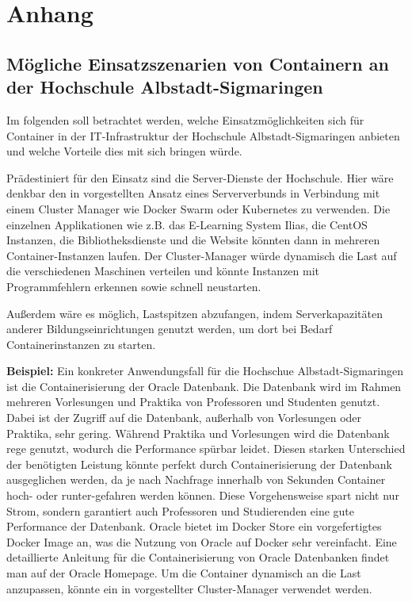 \section{Anhang}
\label{sec:anhang}

\subsection{Mögliche Einsatzszenarien von Containern an der Hochschule Albstadt-Sigmaringen}
\label{app:EinsatzHSAlbSig}

Im folgenden soll betrachtet werden, welche Einsatzmöglichkeiten sich für Container in der IT-Infrastruktur der Hochschule Albstadt-Sigmaringen anbieten und welche Vorteile dies mit sich bringen würde. 

Prädestiniert für den Einsatz sind die Server-Dienste der Hochschule.
Hier wäre denkbar den in  vorgestellten Ansatz eines Serververbunds in Verbindung mit einem Cluster Manager wie Docker Swarm oder Kubernetes zu verwenden.
Die einzelnen Applikationen wie z.B. das E-Learning System Ilias, die CentOS Instanzen, die Bibliotheksdienste und die Website könnten dann in mehreren Container-Instanzen laufen.
Der Cluster-Manager würde dynamisch die Last auf die verschiedenen Maschinen verteilen und könnte Instanzen mit Programmfehlern erkennen sowie schnell neustarten.

Außerdem wäre es möglich, Lastspitzen abzufangen, indem Serverkapazitäten anderer Bildungseinrichtungen genutzt werden, um dort bei Bedarf Containerinstanzen zu starten.

\textbf{Beispiel:}\newline
Ein konkreter Anwendungsfall für die Hochschue Albstadt-Sigmaringen ist die Containerisierung der Oracle Datenbank. Die Datenbank wird im Rahmen mehreren Vorlesungen und Praktika von Professoren und Studenten genutzt. Dabei ist der Zugriff auf die Datenbank, außerhalb von Vorlesungen oder Praktika, sehr gering. Während Praktika und Vorlesungen wird die Datenbank rege genutzt, wodurch die Performance spürbar leidet. Diesen starken Unterschied der benötigten Leistung könnte perfekt durch Containerisierung der Datenbank ausgeglichen werden, da je nach Nachfrage innerhalb von Sekunden Container hoch- oder runter-gefahren werden können. Diese Vorgehensweise spart nicht nur Strom, sondern garantiert auch Professoren und Studierenden eine gute Performance der Datenbank. Oracle bietet im Docker Store ein vorgefertigtes Docker Image an, was die Nutzung von Oracle auf Docker sehr vereinfacht. Eine detaillierte Anleitung für die Containerisierung von Oracle Datenbanken findet man auf der Oracle Homepage. Um die Container dynamisch an die Last anzupassen, könnte ein in  vorgestellter Cluster-Manager verwendet werden.


